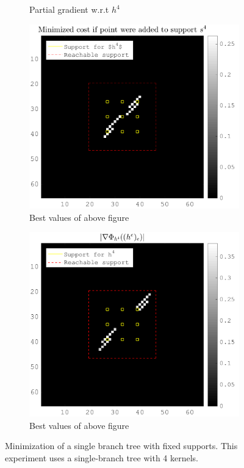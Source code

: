 \begin{figure}[!ht]
\begin{subfigure}[b]{0.49\textwidth}
\caption{Partial gradient w.r.t $h^4$}
\end{subfigure}
\begin{subfigure}[b]{0.49\textwidth}\centering
\includegraphics[width=\textwidth]{figures/xp/xp_128x128_sc2_angl1_K3_S3_node4_objmatrix_bestvalues.png}
\caption{Best values of above figure}
\end{subfigure}
\begin{subfigure}[b]{0.49\textwidth}\centering
\includegraphics[width=\textwidth]{figures/xp/xp_128x128_sc2_angl1_K3_S3_node4_partgrad4_bestvalues.png}
\caption{Best values of above figure}
\end{subfigure}
\caption{Minimization of a single branch tree with fixed supports. This experiment uses a single-branch tree with 4 kernels.}\label{fig_gain_vs_grad}
\end{figure}

